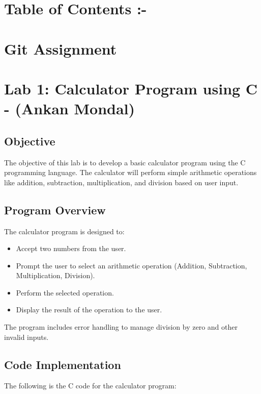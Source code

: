 \documentclass[a4paper,15pt]{article}
\begin{document}
\begin{itemize}[leftmargin=1.5cm]
\vspace{1cm}

\section*{Table of Contents :-}
\tableofcontents

\vspace{1cm}

\newpage

\section*{Git Assignment}
\section{Lab 1: Calculator Program using C - (Ankan Mondal)}

\subsection{Objective}
The objective of this lab is to develop a basic calculator program using the C programming language. The calculator will perform simple arithmetic operations like addition, subtraction, multiplication, and division based on user input.

\subsection{Program Overview}
The calculator program is designed to:
\begin{itemize}
    \item Accept two numbers from the user.
    \item Prompt the user to select an arithmetic operation (Addition, Subtraction, Multiplication, Division).
    \item Perform the selected operation.
    \item Display the result of the operation to the user.
\end{itemize}

The program includes error handling to manage division by zero and other invalid inputs.

\subsection{Code Implementation}
The following is the C code for the calculator program:


\end{itemize}
\end{document}
